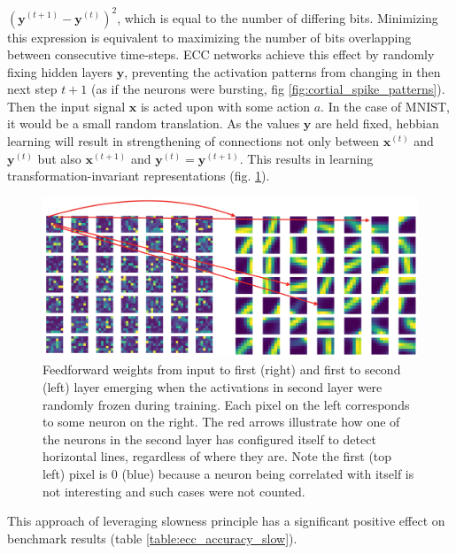 \documentclass[12pt]{article}
\begin{document}
$(\boldsymbol{y}^{(t+1)}-\boldsymbol{y}^{(t)})^2$, which is equal to the number of differing bits. Minimizing this expression is equivalent to maximizing the number of bits overlapping between consecutive time-steps. ECC networks achieve this effect by randomly fixing hidden layers $\boldsymbol{y}$, preventing the activation patterns from changing in then next step $t+1$ (as if the neurons were bursting, fig \ref{fig:cortial_spike_patterns}). Then the input signal $\boldsymbol{x}$ is acted upon with some action $a$. In the case of MNIST, it would be a small random translation. 
As the values $\boldsymbol{y}$ are held fixed, hebbian learning will result in strengthening of connections not only between $\boldsymbol{x}^{(t)}$ and $\boldsymbol{y}^{(t)}$ but also $\boldsymbol{x}^{(t+1)}$ and $\boldsymbol{y}^{(t)}=\boldsymbol{y}^{(t+1)}$. This results in learning transformation-invariant representations (fig. \ref{fig:motor_drift}). 
\begin{figure}[!htbp]
	\centering
	\includegraphics[width=13.5cm]{motor_drift}
	\caption{Feedforward weights from input to first (right) and first to second (left) layer emerging when the activations in second layer were randomly frozen during training. Each pixel on the left corresponds to some neuron on the right. The red arrows illustrate how one of the neurons in the second layer has configured itself to detect horizontal lines, regardless of where they are. Note the first (top left) pixel is $0$ (blue) because a neuron being correlated with itself is not interesting and such cases were not counted.}
	\label{fig:motor_drift}
\end{figure} 
This approach of leveraging slowness principle has a significant  positive effect on benchmark results (table \ref{table:ecc_accuracy_slow}). 
\end{document}

